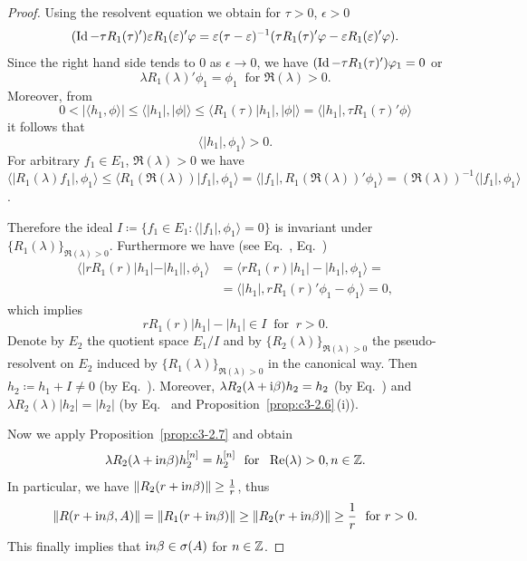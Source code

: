 \begin{proof}
Using the resolvent equation  we obtain for $\tau > 0$, $\epsilon > 0$
\[
(\Id - \tau R_{1}(\tau)')\epsilon R_{1}(\epsilon)'\phi = \epsilon(\tau-\epsilon)^{-1}(\tau R_{1}(\tau)'\phi - \epsilon R_{1}(\epsilon)'\phi) .
\]
Since the right hand side tends to $0$ as $\epsilon \to 0$, we have $(\Id - \tau R_{1}(\tau)')\phi_{1} = 0$ or
\begin{equation}\label{eq:c3-2.18}
\lambda R_{1}(\lambda)'\phi_{1} = \phi_{1} \ \text{ for } \Re(\lambda) > 0 .
\end{equation} 
Moreover, from 
\[
0 < |\langle h_{1},\phi \rangle| \leq \langle |h_{1}|,|\phi| \rangle \leq \langle R_{1}(\tau)|h_{1}|,|\phi| \rangle = \langle |h_{1}|,\tau R_{1}(\tau)'\phi \rangle 
\]
it follows that
\begin{equation}\label{eq:c3-2.19}
		\langle |h_{1}|,\phi_{1} \rangle > 0 .
\end{equation}
For arbitrary $f_{1} \in E_{1}$, $\Re(\lambda) > 0$ we have $\langle |R_{1}(\lambda)f_{1}|,\phi_{1} \rangle \leq \langle R_{1}(\Re(\lambda))|f_{1}|,\phi_{1} \rangle = \langle |f_{1}|,R_{1}(\Re(\lambda))'\phi_{1} \rangle = (\Re(\lambda))^{-1}\langle |f_{1}|,\phi_{1} \rangle$.

Therefore the ideal $I \coloneq \{f_{1} \in E_{1} \colon \langle |f_{1}|,\phi_{1} \rangle = 0\}$ is invariant under $\{R_{1}(\lambda)\}_{\Re(\lambda)>0}$.
Furthermore we have (see Eq.~, Eq.~) 
\begin{align*}
	\langle |rR_{1}(r)|h_{1}| - |h_{1}||,\phi_{1} \rangle &= \langle rR_{1}(r)|h_{1}| - |h_{1}|,\phi_{1} \rangle = \\
	& = \langle |h_{1}|,rR_{1}(r)'\phi_{1} - \phi_{1} \rangle = 0 ,
\end{align*}	
which implies
\begin{equation}\label{eq:c3-2.20}
rR_{1}(r)|h_{1}| - |h_{1}| \in I \ \text{ for } \ r > 0 .
\end{equation}
Denote by $E_{2}$ the quotient space $E_{1}/I$ and by $\{R_{2}(\lambda)\}_{\Re(\lambda)>0}$ the pseudo-resolvent on $E_{2}$ induced by $\{R_{1}(\lambda)\}_{\Re(\lambda)>0}$ in the canonical way. 
Then $h_{2} \coloneq h_{1} + I \neq 0$ (by Eq.~).
Moreover, $\lambda R_{2}(\lambda+\mathrm{i}\beta)h_{2} = h_{2}$ (by Eq.~) and $\lambda R_{2}(\lambda)|h_{2}| = |h_{2}|$ (by Eq.~ and Proposition~\ref{prop:c3-2.6}\,(i)).

Now we apply Proposition~\ref{prop:c3-2.7} and obtain
\begin{equation}\label{eq:c3-2.21}
	\lambda R_{2}(\lambda+\mathrm{i} n\beta)h_{2}^{[n]} = h_{2}^{[n]}\ \text{ for } \ \mathop{}\!\mathrm{Re}(\lambda) > 0 , n \in \mathbb{Z} .
\end{equation}
In particular, we have $\|R_{2}(r+\im n\beta)\| \geq \frac{1}{r}$, thus 
\[
\|R(r+\im n\beta,A)\| = \|R_{1}(r+\im n\beta)\| \geq \|R_{2}(r+\im n\beta)\| \geq \frac{1}{r} \ \text{ for } r > 0 .
\]
This finally implies that $ \mathrm{i} n\beta \in \sigma(A)$ for $n \in \mathbb{Z}$.
\end{proof}
